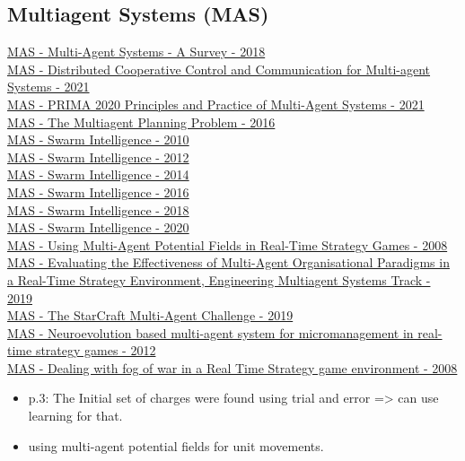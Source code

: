 \subsection{Multiagent Systems (MAS)}
\href{https://ieeexplore.ieee.org/abstract/document/8352646}{MAS - Multi-Agent Systems - A Survey - 2018}
\\
\href{https://link.springer.com/book/10.1007%2F978-981-33-6718-0}{MAS - Distributed Cooperative Control and Communication for Multi-agent Systems - 2021}
\\
\href{https://link.springer.com/book/10.1007%2F978-3-030-69322-0}{MAS - PRIMA 2020 Principles and Practice of Multi-Agent Systems - 2021}
\\
\href{https://www.hindawi.com/journals/complexity/2017/3813912/}{MAS - The Multiagent Planning Problem - 2016}
\\
\href{https://link.springer.com/book/10.1007/978-3-642-15461-4}{MAS - Swarm Intelligence - 2010}
\\
\href{https://link.springer.com/book/10.1007/978-3-642-32650-9}{MAS - Swarm Intelligence - 2012}
\\
\href{https://link.springer.com/book/10.1007/978-3-319-09952-1}{MAS - Swarm Intelligence - 2014}
\\
\href{https://link.springer.com/book/10.1007/978-3-319-44427-7}{MAS - Swarm Intelligence - 2016}
\\
\href{https://link.springer.com/book/10.1007/978-3-030-00533-7}{MAS - Swarm Intelligence - 2018}
\\
\href{https://link.springer.com/book/10.1007/978-3-030-60376-2}{MAS - Swarm Intelligence - 2020}
\\
\href{https://www.diva-portal.org/smash/record.jsf?pid=diva2%3A805249&dswid=2610}{MAS - Using Multi-Agent Potential Fields in Real-Time Strategy Games - 2008}
\\
\href{https://dl.acm.org/doi/abs/10.5555/3306127.3331766}{MAS - Evaluating the Effectiveness of Multi-Agent Organisational Paradigms in a Real-Time Strategy Environment, Engineering Multiagent Systems Track - 2019}
\\
\href{https://dl.acm.org/doi/10.5555/3306127.3332052}{MAS - The StarCraft Multi-Agent Challenge - 2019}
\\
\href{https://dl.acm.org/doi/abs/10.1145/2371316.2371324}{MAS - Neuroevolution based multi-agent system for micromanagement in real-time strategy games - 2012}
\\
\href{https://ieeexplore.ieee.org/document/5035621}{MAS - Dealing with fog of war in a Real Time Strategy game environment - 2008}
\begin{itemize}[noitemsep,nolistsep]
	\item p.3: The Initial set of charges were found using trial and error => can use learning for that.
	\item using multi-agent potential fields for unit movements.
\end{itemize}


